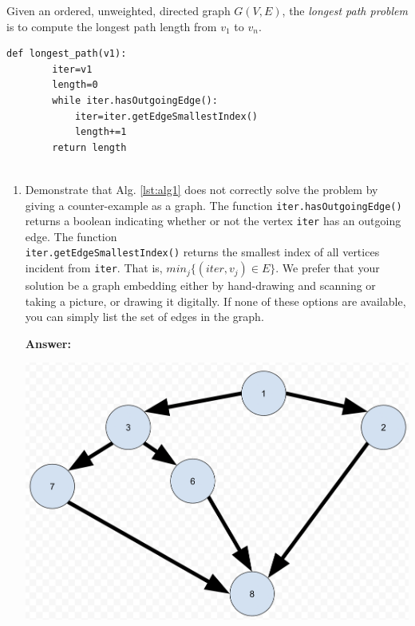 \documentclass[12pt,letterpaper]{article}
\begin{document}
Given an ordered, unweighted, directed graph $G(V,E)$, the \textit{longest path problem} is to compute the longest path length from $v_1$ to $v_n$.

    \begin{lstlisting}[style = Python]
    def longest_path(v1):
        iter=v1
        length=0
        while iter.hasOutgoingEdge():
            iter=iter.getEdgeSmallestIndex()
            length+=1
        return length
            
    \end{lstlisting}

\begin{enumerate}
    \item Demonstrate that Alg. \ref{lst:alg1} does not correctly solve the problem by giving a counter-example as a graph. 
    The function \texttt{iter.hasOutgoingEdge()} returns a boolean indicating whether or not the vertex \texttt{iter} has an outgoing edge.
    The function \\
    \texttt{iter.getEdgeSmallestIndex()} returns the smallest index of all vertices incident from \texttt{iter}. 
    That is, $min_j \{ (iter,v_j) \in E \}$.
    We prefer that your solution be a graph embedding either by hand-drawing and scanning or taking a picture, or drawing it digitally. 
    If none of these options are available, you can simply list the set of edges in the graph.
    \vspace{0.5cm}

    \textbf{Answer:}
    \begin{center}
        \includegraphics[scale = .25]{images/graph.png}
    \end{center}
        \newpage


\end{enumerate}
\end{document}
